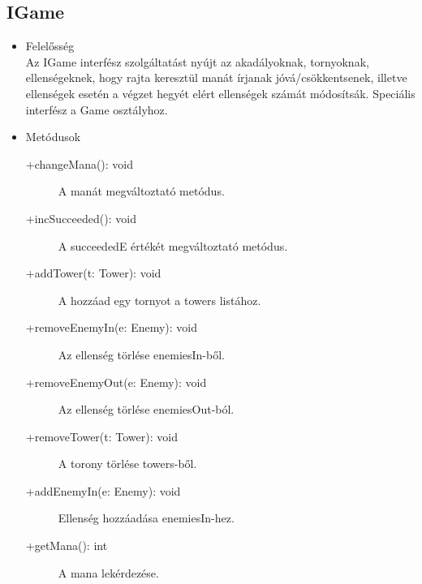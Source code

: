 \subsection{IGame}
\begin{itemize}
\item Felelősség\\
Az IGame interfész szolgáltatást nyújt az akadályoknak, tornyoknak, ellenségeknek, hogy rajta keresztül manát írjanak jóvá/csökkentsenek, illetve ellenségek esetén a végzet hegyét elért ellenségek számát módosítsák. Speciális interfész a Game osztályhoz. 

\item Metódusok\\
	\begin{description}
		\item[+changeMana(): void] A manát megváltoztató metódus. 
\item[+incSucceeded(): void] A succeededE értékét megváltoztató metódus.
\item[+addTower(t: Tower): void] A hozzáad egy tornyot a towers listához.
\item[+removeEnemyIn(e: Enemy): void] Az ellenség törlése enemiesIn-ből. 
\item[+removeEnemyOut(e: Enemy): void] Az ellenség törlése enemiesOut-ból. 
\item[+removeTower(t: Tower): void] A torony törlése towers-ből. 
\item[+addEnemyIn(e: Enemy): void] Ellenség hozzáadása enemiesIn-hez. 
\item[+getMana(): int] A mana lekérdezése. 


		
	\end{description}
\end{itemize}


